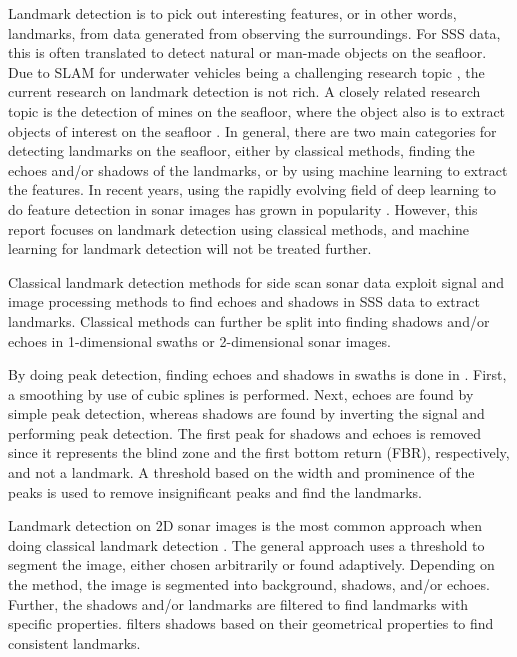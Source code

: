 Landmark detection is to pick out interesting features, or in other words, landmarks, from data generated from observing the surroundings. For SSS data, this is often translated to detect natural or man-made objects on the seafloor. Due to SLAM for underwater vehicles being a challenging research topic \cite{Hidalgo2015ReviewTechniques}, the current research on landmark detection is not rich. A closely related research topic is the detection of mines on the seafloor, where the object also is to extract objects of interest on the seafloor \cite{Picard2016DetectionDimensionality}. In general, there are two main categories for detecting landmarks on the seafloor, either by classical methods, finding the echoes and/or shadows of the landmarks, or by using machine learning to extract the features. In recent years, using the rapidly evolving field of deep learning to do feature detection in sonar images has grown in popularity \cite{Wang2020ImageSonar} \cite{Zhou2022NonlinearFeatures}. However, this report focuses on landmark detection using classical methods, and machine learning for landmark detection will not be treated further.

Classical landmark detection methods for side scan sonar data exploit signal and image processing methods to find echoes and shadows in SSS data to extract landmarks. Classical methods can further be split into finding shadows and/or echoes in 1-dimensional swaths or 2-dimensional sonar images.

By doing peak detection, finding echoes and shadows in swaths is done in \cite{Al-Rawi2017LandmarkImages}. First, a smoothing by use of cubic splines is performed. Next, echoes are found by simple peak detection, whereas shadows are found by inverting the signal and performing peak detection. The first peak for shadows and echoes is removed since it represents the blind zone and the first bottom return (FBR), respectively, and not a landmark. A threshold based on the width and prominence of the peaks is used to remove insignificant peaks and find the landmarks.  

Landmark detection on 2D sonar images is the most common approach when doing classical landmark detection \cite{Wang2017UnderwaterSonar} \cite{Siantidis2016SideVehicles} \cite{Yuan2016AnNavigation} \cite{Leblond2019SonarProject}. The general approach uses a threshold to segment the image, either chosen arbitrarily or found adaptively. Depending on the method, the image is segmented into background, shadows, and/or echoes. Further, the shadows and/or landmarks are filtered to find landmarks with specific properties. \cite{Leblond2019SonarProject} filters shadows based on their geometrical properties to find consistent landmarks. 

